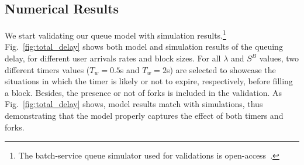 \documentclass[conference]{IEEEtran}
\theoremstyle{definition}
\begin{document}
\subsection{Numerical Results}
We start validating our queue model with simulation results.\footnote{The batch-service queue simulator used for validations is open-access~\cite{batchsim}.} Fig.~\ref{fig:total_delay} shows both model and simulation results of the queuing delay, for different user arrivals rates and block sizes. For all $\lambda$ and $S^B$ values, two different timers values ($T_w=0.5$s and $T_w=2$s) are selected to showcase the situations in which the timer is likely or not to expire, respectively, before filling a block. Besides, the presence or not of forks is included in the validation. As Fig.~\ref{fig:total_delay} shows, model results match with simulations, thus demonstrating that the model properly captures the effect of both timers and forks.
\end{document}
